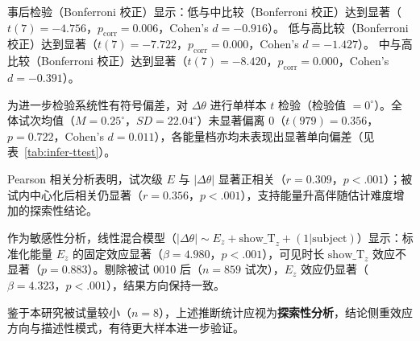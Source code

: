 事后检验（Bonferroni 校正）显示：低与中比较（Bonferroni 校正）达到显著（$t(7) = -4.756$，$p_{\mathrm{corr}} = 0.006$，Cohen's $d = -0.916$）。 低与高比较（Bonferroni 校正）达到显著（$t(7) = -7.722$，$p_{\mathrm{corr}} = 0.000$，Cohen's $d = -1.427$）。 中与高比较（Bonferroni 校正）达到显著（$t(7) = -8.420$，$p_{\mathrm{corr}} = 0.000$，Cohen's $d = -0.391$）。




为进一步检验系统性有符号偏差，对 $\Delta\theta$ 进行单样本 $t$ 检验（检验值 $= 0^\circ$）。全体试次均值（$M = 0.25^\circ$，$SD = 22.04^\circ$）未显著偏离 0（$t(979) = 0.356$，$p = 0.722$，Cohen's $d = 0.011$），各能量档亦均未表现出显著单向偏差（见表~\ref{tab:infer-ttest}）。



Pearson 相关分析表明，试次级 $E$ 与 $|{\Delta\theta}|$ 显著正相关（$r = 0.309$，$p < .001$）；被试内中心化后相关仍显著（$r = 0.356$，$p < .001$），支持能量升高伴随估计难度增加的探索性结论。

作为敏感性分析，线性混合模型（$|{\Delta\theta}| \sim E_{z} + \mathrm{show\_T}_{z} + (1|\mathrm{subject})$）显示：标准化能量 $E_z$ 的固定效应显著（$\beta = 4.980$，$p < .001$），可见时长 $\mathrm{show\_T}_z$ 效应不显著（$p = 0.883$）。剔除被试 0010 后（$n = 859$ 试次），$E_z$ 效应仍显著（$\beta = 4.323$，$p < .001$），结果方向保持一致。

鉴于本研究被试量较小（$n = 8$），上述推断统计应视为\textbf{探索性分析}，结论侧重效应方向与描述性模式，有待更大样本进一步验证。
